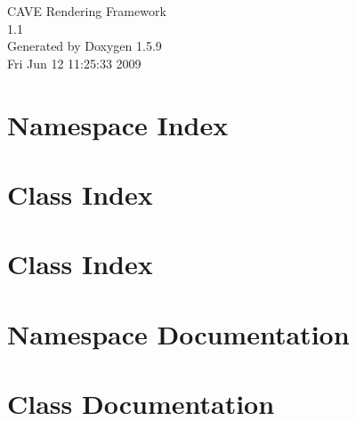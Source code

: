 \documentclass[a4paper]{book}
\begin{document}
\hypersetup{pageanchor=false}
\begin{titlepage}
\vspace*{7cm}
\begin{center}
{\Large CAVE Rendering Framework \\[1ex]\large 1.1 }\\
\vspace*{1cm}
{\large Generated by Doxygen 1.5.9}\\
\vspace*{0.5cm}
{\small Fri Jun 12 11:25:33 2009}\\
\end{center}
\end{titlepage}
\clearemptydoublepage
{}
\tableofcontents
\clearemptydoublepage
{}
\hypersetup{pageanchor=true}
\chapter{Namespace Index}

\chapter{Class Index}

\chapter{Class Index}

\chapter{Namespace Documentation}


\chapter{Class Documentation}















\printindex
\end{document}

